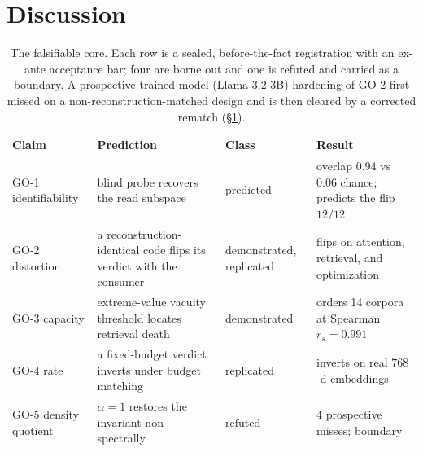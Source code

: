 \documentclass[lettersize,onecolumn]{IEEEtran}
\theoremstyle{definition}
\theoremstyle{remark}
\begin{document}
\section{Discussion}\label{sec:discussion}

\begin{table}[!t]
\centering
\footnotesize
\caption{The falsifiable core. Each row is a sealed, before-the-fact registration with
an ex-ante acceptance bar; four are borne out and one is refuted and carried as a
boundary. A prospective trained-model (Llama-3.2-3B) hardening of GO-2 first missed on
a non-reconstruction-matched design and is then cleared by a corrected rematch
(\S\ref{sec:discussion}).}
\label{tab:scoreboard}
\setlength{\tabcolsep}{6pt}\renewcommand{\arraystretch}{1.3}
\begin{tabular}{@{}L{1.3cm}L{4.2cm}L{1.7cm}L{3.6cm}@{}}
\toprule
\textbf{Claim} & \textbf{Prediction} & \textbf{Class} & \textbf{Result} \\
\midrule
GO-1 identifiability & blind probe recovers the read subspace & predicted & overlap $0.94$ vs $0.06$ chance; predicts the flip $12/12$ \\
GO-2 distortion & a reconstruction-identical code flips its verdict with the consumer & demonstrated, replicated & flips on attention, retrieval, and optimization \\
GO-3 capacity & extreme-value vacuity threshold locates retrieval death & demonstrated & orders 14 corpora at Spearman $r_s=0.991$ \\
GO-4 rate & a fixed-budget verdict inverts under budget matching & replicated & inverts on real $768$-d embeddings \\
GO-5 density quotient & $\alpha{=}1$ restores the invariant non-spectrally & refuted & 4 prospective misses; boundary \\
\bottomrule
\end{tabular}
\end{table}
\end{document}
